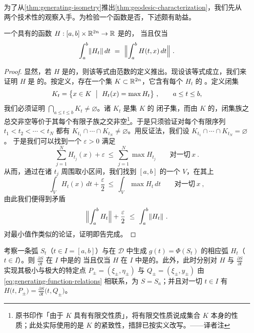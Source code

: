 为了从\cref{thm:generating-isometry}推出\cref{thm:geodesic-characterization}，我们先从%
两个技术性的观察入手。为检验一个函数是否\trQuasiAutonomous，下述\trhLemma{}颇有助益。

\begin{lemma}\label{lem:quasi-autonomous-integral}
一个具有\trCompactSupport{}的\trSmooth{}函数 $H:[a,b]\times\mathbb{R}^{2n}\to\mathbb{R}$ 是\trQuasiAutonomous{}的，%
当且仅当
\[
\int_{a}^{b}\lVert H_{t}\rVert\,dt\ =\ \Bigl\lVert\int_{a}^{b}H(t,x)\,dt\Bigr\rVert\ .
\]
\end{lemma}

\begin{proof}
显然，若 $H$ 是\trQuasiAutonomous{}的，则该等式由范数的定义推出。现设该等式成立，我们来证明 $H$ 是%
\trQuasiAutonomous{}的。按定义，存在一个\trCompact{}集 $K\subset\mathbb{R}^{2n}$，它含有每个 $H_{t}$ 的%
\trSupport。定义闭集
\[
K_{t}=\bigl\{x\in K\ \bigm|\ H_{t}(x)=\max H_{t}\bigr\}\ ,\qquad a\leq t\leq b,
\]
我们必须证明 $\bigcap_{a\leq t\leq b}K_{t}\neq\varnothing$。诸 $K_{t}$ 是\trCompact{}集 $K$ 的%
闭子集，而由 $K$ 的\trCompactness，闭集族之总交非空等价于其每个有限子族之交非空\footnote{原书印作「由于 $K$ 具有有限交性质」，将有限交性质说成集合 $K$ 本身的性质；此处实际使用的是 $K$ 的紧致性，措辞已按实义改写。——译者注}。于是只须验证对每个有限序列 $t_{1}<t_{2}<\cdots<t_{N}$ 都有 $K_{t_{1}}\cap\cdots\cap%
K_{t_{N}}\neq\varnothing$。用反证法，我们设 $K_{t_{1}}\cap\cdots\cap K_{t_{N}}=\varnothing$。%
于是我们可以找到一个 $\varepsilon>0$ 满足
\[
\sum_{j=1}^{N}H_{t_{j}}(x)+\varepsilon\ \leq\ \sum_{j=1}^{N}\max H_{t_{j}}\qquad%
\text{对一切}\ x\ .
\]
从而，通过在诸 $t_{j}$ 周围取小区间，我们找到 $[a,b]$ 的一个\trOpenSet{} $V$，在其上
\[
\int_{V}H_{t}(x)\,dt+\frac{\varepsilon}{2}\ \leq\ \int_{V}\max H_{t}\,dt\qquad%
\text{对一切}\ x\ ,
\]
由此我们便得到矛盾
\[
\Bigl\lVert\int_{a}^{b}H_{t}\Bigr\rVert+\frac{\varepsilon}{2}\ \leq\ \int_{a}^{b}\lVert H_{t}\rVert\ .
\]
对最小值作类似的论证，证明即告完成。
\end{proof}

\begin{lemma}\label{lem:generating-quasi-autonomous}
考察一条弧 $S_{t}$（$t\in I=[a,b]$）与在 $\mathcal{D}$ 中生成\trPath{} $g(t)=\varPhi(S_{t})$%
的相应弧 $H_{t}$（$t\in I$）。则 $\frac{\partial S}{\partial t}$ 在 $I$ 中是\trQuasiAutonomous{}的%
当且仅当 $H$ 在 $I$ 中是\trQuasiAutonomous{}的。此外，此时分别对 $H$ 与 $\frac{\partial S}{\partial t}$%
实现其极小与极大的特定点 $P_{\pm}=(\xi_{\pm},\eta_{\pm})$ 与 $Q_{\pm}=(\xi_{\pm},y_{\pm})$%
由 \eqref{eq:generating-function-relations} 相联系，\trGeneratingFunction{}为 $S=S_{a}$；并且对一切%
$t\in I$ 有 $H\bigl(t,P_{\pm}\bigr)=\frac{\partial S}{\partial t}\bigl(t,Q_{\pm}\bigr)$。
\end{lemma}

